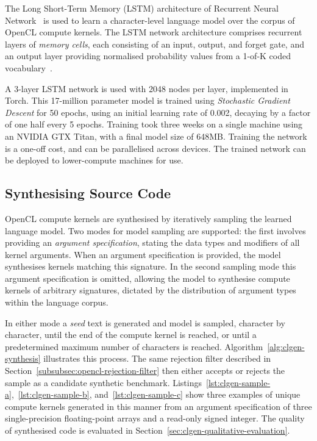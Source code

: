 The Long Short-Term Memory (LSTM) architecture of Recurrent Neural Network~\cite{Sundermeyer2012,Mikolov2015} is used to learn a character-level language model over the corpus of OpenCL compute kernels. The LSTM network architecture comprises recurrent layers of \emph{memory cells}, each consisting of an input, output, and forget gate, and an output layer providing normalised probability values from a 1-of-K coded vocabulary~\cite{Graves}.

A 3-layer LSTM network is used with 2048 nodes per layer, implemented in Torch. This 17-million parameter model is trained using \textit{Stochastic Gradient Descent} for 50 epochs, using an initial learning rate of 0.002, decaying by a factor of one half every 5 epochs. Training took three weeks on a single machine using an NVIDIA GTX Titan, with a final model size of 648MB. Training the network is a one-off cost, and can be parallelised across devices. The trained network can be deployed to lower-compute machines for use.

\subsection{Synthesising Source Code}
\label{subsec:synthesizing-opencl}

OpenCL compute kernels are synthesised by iteratively sampling the learned language model. Two modes for model sampling are supported: the first involves providing an \emph{argument specification}, stating the data types and modifiers of all kernel arguments. When an argument specification is provided, the model synthesises kernels matching this signature. In the second sampling mode this argument specification is omitted, allowing the model to synthesise compute kernels of arbitrary signatures, dictated by the distribution of argument types within the language corpus.

In either mode a \emph{seed} text is generated and model is sampled, character by character, until the end of the compute kernel is reached, or until a predetermined maximum number of characters is reached. Algorithm~\ref{alg:clgen-synthesis} illustrates this process. The same rejection filter described in Section~\ref{subsubsec:opencl-rejection-filter} then either accepts or rejects the sample as a candidate synthetic benchmark. Listings~\ref{lst:clgen-sample-a},~\ref{lst:clgen-sample-b}, and~\ref{lst:clgen-sample-c} show three examples of unique compute kernels generated in this manner from an argument specification of three single-precision floating-point arrays and a read-only signed integer. The quality of synthesised code is evaluated in Section~\ref{sec:clgen-qualitative-evaluation}.

